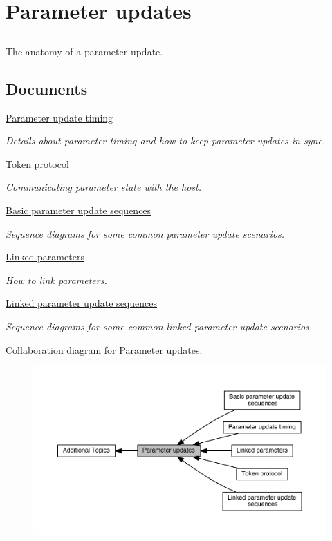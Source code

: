 \hypertarget{a00350}{}\section{Parameter updates}
\label{a00350}


\subsection{ }
The anatomy of a parameter update. 

\subsection*{Documents}
\begin{DoxyCompactItemize}
\item 
\hyperlink{a00351}{Parameter update timing}
\begin{DoxyCompactList}\small\item\em Details about parameter timing and how to keep parameter updates in sync. \end{DoxyCompactList}\item 
\hyperlink{a00352}{Token protocol}
\begin{DoxyCompactList}\small\item\em Communicating parameter state with the host. \end{DoxyCompactList}\item 
\hyperlink{a00353}{Basic parameter update sequences}
\begin{DoxyCompactList}\small\item\em Sequence diagrams for some common parameter update scenarios. \end{DoxyCompactList}\item 
\hyperlink{a00354}{Linked parameters}
\begin{DoxyCompactList}\small\item\em How to link parameters. \end{DoxyCompactList}\item 
\hyperlink{a00355}{Linked parameter update sequences}
\begin{DoxyCompactList}\small\item\em Sequence diagrams for some common linked parameter update scenarios. \end{DoxyCompactList}\end{DoxyCompactItemize}
Collaboration diagram for Parameter updates\+:
\nopagebreak
\begin{figure}[H]
\begin{center}
\leavevmode
\includegraphics[width=350pt]{a00350}
\end{center}
\end{figure}
